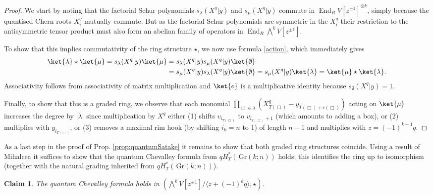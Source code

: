 \documentclass[12pt]{amsart}
\newcommand{\Gr}{\,\mathrm{Gr}}
\newcommand{\End}{\operatorname{End}}
\newcommand{\ring}{R}
\newtheorem{claim}{Claim}[section]
\numberwithin{equation}{section}
\numberwithin{figure}{section}
\begin{document}
\begin{proof}
 We start by noting that the factorial Schur polynomials $s_\lambda(X^q|y)$ and $s_\mu(X^q|y)$ commute in $\End_{\ring} V[z^{\pm1}]^{\otimes k}$, simply because the quantised Chern roots $X_i^q$ mutually commute. But as the factorial Schur polynomials are symmetric in the $X_i^q$ their restriction to the antisymmetric tensor product must also form an abelian family of operators in $\End_{\ring} \bigwedge^kV[z^{\pm 1}]$.

To show that this implies commutativity of the ring structure $\star$, we now use formula \eqref{action}, which immediately gives
    \begin{align*}
    \ket{\lambda} \star \ket{\mu} = s_{\lambda}(X^q|y) \ket{\mu} =\;& s_{\lambda}(X^q|y) s_{\mu}(X^q|y)\ket{\emptyset}\\=\;&
    s_{\mu}(X^q|y) s_{\lambda}(X^q|y)\ket{\emptyset} = s_{\mu}(X^q|y) \ket{\lambda} =\ket{\mu} \star \ket{\lambda}.
    \end{align*}
    Associativity follows from associativity of matrix multiplication and $\ket{e}$ is a multiplicative identity because $s_{\emptyset}(X^q|y) = 1$.
    
    Finally, to show that this is a graded ring, we observe that each monomial $\prod_{\Box\in\lambda}(X^q_{T(\Box)}-y_{T(\Box)+c(\Box)})$ acting on $\ket{\mu}$ increases the degree by $|\lambda|$ since multiplication by $X^q$ either (1) shifts $v_{i_{T(\Box)}}$ to $v_{i_{T(\Box)}+1}$ (which amounts to adding a box), or (2) multiplies with $y_{i_{T(\Box)}}$, or (3) removes a maximal rim hook (by shifting $i_k=n$ to $1$) of length $n-1$ and multiplies with $z=(-1)^{k-1}q$.
\end{proof}
As a last step in the proof of Prop. \ref{prop:quantumSatake} it remains to show that both graded ring structures coincide. Using a result of Mihalcea \cite[Cor. 7.1]{MihalceaAIM} it suffices to show that the quantum Chevalley formula from $qH^*_T(\Gr(k;n))$ holds; this identifies the ring up to isomorphism (together with the natural grading inherited from $qH^*_T(\Gr(k;n))$).
\begin{claim}\label{claim:quantumChevalley}
The quantum Chevalley formula holds in $(\bigwedge^kV[z^{\pm 1}]/\langle z+(-1)^kq\rangle,\star)$.
\end{claim}
\end{document}
